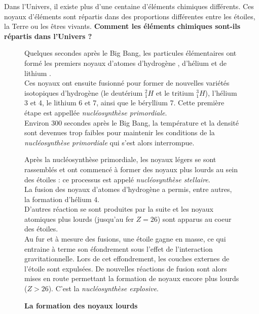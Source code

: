 \documentclass[a4paper,11pt,fleqn]{article}%
\begin{document}
\maketitle
Dans l'Univers, il existe plus d'une centaine d'éléments chimiques différents. Ces noyaux d'éléments sont répartis dans des proportions différentes entre les étoiles, la Terre ou les êtres vivants. \textbf{Comment les éléments chimiques sont-ils répartis dans l'Univers ?}

\begin{figure}[h!]
    \begin{minipage}{.48\linewidth}
    \caption{\textbf{La formation des premiers noyaux}}
    Quelques secondes après le Big Bang, les particules élémentaires ont formé les premiers noyaux d'atomes d'hydrogène , d'hélium  et de lithium .\\
    Ces noyaux ont ensuite fusionné pour former de nouvelles variétés isotopiques d'hydrogène (le deutérium $_1^2H$ et le tritium $_1^3H$), l'hélium 3 et 4, le lithium 6 et 7, ainsi que le béryllium 7. Cette première étape est appellée \textit{nucléosynthèse primordiale}.\\
    Environ 300 secondes après le Big Bang, la température et la densité sont devenues trop faibles pour maintenir les conditions de la \textit{nucléosynthèse primordiale} qui s'est alors interrompue.
    \end{minipage}\hspace{.04\linewidth}
    \begin{minipage}{.48\linewidth}
        \caption{\textbf{La formation des noyaux lourds}}
        Après la nucléosynthèse primordiale, les noyaux légers se sont rassemblés et ont commencé à former des noyaux plus lourds au sein des étoiles : ce processus est appelé \textit{nucléosynthèse stellaire}.\\
        La fusion des noyaux d'atomes d'hydrogène a permis, entre autres, la formation d'hélium 4.\\
        D'autres réaction se sont produites par la suite et les noyaux atomiques plus lourds (jusqu'au fer $Z=26$) sont apparus au coeur des étoiles.\\
        Au fur et à mesure des fusions, une étoile gagne en masse, ce qui entraine à terme son éfondrement sous l'effet de l'interaction gravitationnelle. Lors de cet effondrement, les couches externes de l'étoile sont expulsées. De nouvelles réactions de fusion sont alors mises en route permettant la formation de noyaux encore plus lourds ($Z>26$). C'est la \textit{nucléosynthèse explosive}.
        \end{minipage}
\end{figure}
\end{document}

